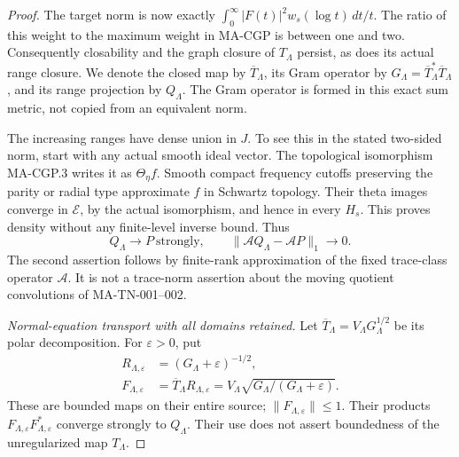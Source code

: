 \begin{proof}
The target norm is now exactly
\(\int_0^\infty |F(t)|^2w_s(\log t)\,dt/t\).
The ratio of this weight to the maximum weight in MA-CGP is
between one and two.  Consequently closability and the graph
closure of \(T_\Lambda\) persist, as does its actual range
closure.  We denote the closed map by \(\overline T_\Lambda\),
its Gram operator by \(G_\Lambda=\overline T_\Lambda^*
\overline T_\Lambda\), and its range projection by \(Q_\Lambda\).
The Gram operator is formed in this exact sum metric, not copied
from an equivalent norm.

The increasing ranges have dense union in \(J\).  To see this
in the stated two-sided norm, start with any actual smooth ideal
vector.  The topological isomorphism MA-CGP.3 writes it as
\(\Theta_\eta f\).  Smooth compact frequency cutoffs preserving
the parity or radial type approximate \(f\) in Schwartz topology.
Their theta images converge in \(\mathcal E\), by the actual
isomorphism, and hence in every \(H_s\).  This proves density
without any finite-level inverse bound.  Thus
\[
 Q_\Lambda\longrightarrow P\ \text{strongly},\qquad
 \|\mathcal A Q_\Lambda-\mathcal A P\|_1\longrightarrow0.
 \tag{MA-MO.216}
\]
The second assertion follows by finite-rank approximation of
the fixed trace-class operator \(\mathcal A\).  It is not a
trace-norm assertion about the moving quotient convolutions
of MA-TN-001--002.

\emph{Normal-equation transport with all domains retained.}
Let \(\overline T_\Lambda=V_\Lambda G_\Lambda^{1/2}\) be its
polar decomposition.  For \(\varepsilon>0\), put
\[
 \begin{aligned}
 R_{\Lambda,\varepsilon}&=(G_\Lambda+\varepsilon)^{-1/2},\\
 F_{\Lambda,\varepsilon}&=\overline T_\Lambda
             R_{\Lambda,\varepsilon}
   =V_\Lambda\sqrt{G_\Lambda/(G_\Lambda+\varepsilon)}.
 \end{aligned}
 \tag{MA-MO.217}
\]
These are bounded maps on their entire source;
\(\|F_{\Lambda,\varepsilon}\|\le1\).  Their products
\(F_{\Lambda,\varepsilon}F_{\Lambda,\varepsilon}^*\)
converge strongly to \(Q_\Lambda\).  Their use does not
assert boundedness of the unregularized map \(T_\Lambda\).


\end{proof}
